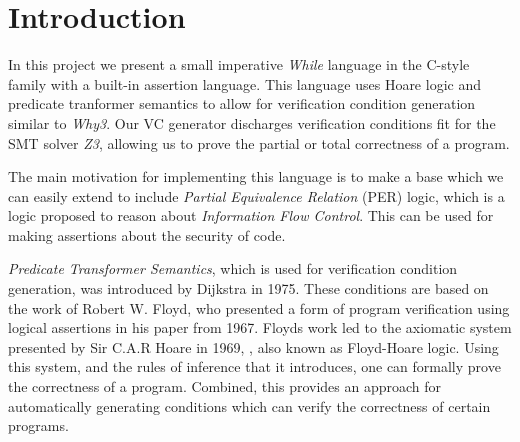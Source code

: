 \section{Introduction}



In this project we present a small imperative \textit{While} language in the C-style family with a built-in assertion language.
This language uses Hoare logic and predicate tranformer semantics to allow for verification condition generation similar to \textit{Why3}.
Our VC generator discharges verification conditions fit for the SMT solver \textit{Z3}, allowing us to prove the partial or total correctness of a program.

The main motivation for implementing this language is to make a base which we can easily extend to include \textit{Partial Equivalence Relation} (PER) logic, which is a logic proposed to reason about \textit{Information Flow Control}\cite{}. This can be used for making assertions about the security of code.

\textit{Predicate Transformer Semantics}, which is used for verification condition generation, was introduced by Dijkstra in 1975\cite{Dijkstra}.
These conditions are based on the work of Robert W. Floyd, who presented a form of program verification using logical assertions in his paper from 1967\cite{Floyd1967}. 
Floyds work led to the axiomatic system presented by Sir C.A.R Hoare in 1969, \cite{Hoare}, also known as Floyd-Hoare logic. Using this system, and the rules of inference that it introduces, one can formally prove the correctness of a program.
Combined, this provides an approach for automatically generating conditions which can verify the correctness of certain programs.

